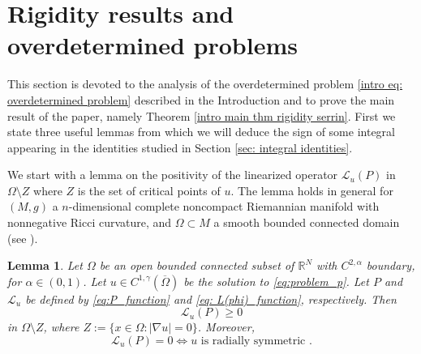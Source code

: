 \documentclass[10pt,a4paper, reqno]{amsart}
\numberwithin{equation}{section}
\newcommand{\R}{\mathbb{R}}
\newtheorem{lemma}[teo]{Lemma}
\begin{document}
    \section{Rigidity results and overdetermined problems}\label{sec: rigidity}
    This section is devoted to the analysis of the overdetermined problem \eqref{intro eq: overdetermined problem} described in the Introduction and to prove the main result of the paper, namely Theorem \ref{intro main thm rigidity serrin}. First we state three useful lemmas from which we will deduce the sign of some integral appearing in the identities studied in Section \ref{sec: integral identities}.
    
    We start with a lemma on the positivity of the linearized operator $\mathcal{L}_u(P)$ in $\Omega \setminus Z$ where $Z$ is the set of critical points of $u$. The lemma holds in general for $(M, g)$ a $n$-dimensional complete noncompact Riemannian manifold with nonnegative Ricci curvature, and $\Omega \subset M$ a smooth bounded connected domain (see \cite[Lem.\,4]{RuHuCh24}).

    \begin{lemma}\label{lemma positivity L(P)}
        Let $\Omega$ be an open bounded connected subset of $\R^N$ with $C^{2,\alpha}$ boundary, for $\alpha \in (0,1)$. Let $u \in C^{1,\gamma}(\overline{\Omega})$ be the solution to \eqref{eq:problem_p}. Let $P$ and $\mathcal{L}_u$ be defined by \eqref{eq:P_function} and \eqref{eq: L(phi)_function}, respectively. Then
        \begin{equation*}
            \mathcal{L}_u(P) \geq 0
        \end{equation*}
        in $\Omega\setminus Z$, where $Z := \{x \in \Omega \colon |\nabla u| = 0\}$. Moreover, 
        \begin{equation*}
            \mathcal{L}_u(P) = 0  \iff u \text{ is radially symmetric }.
        \end{equation*}
    \end{lemma}
\end{document}
